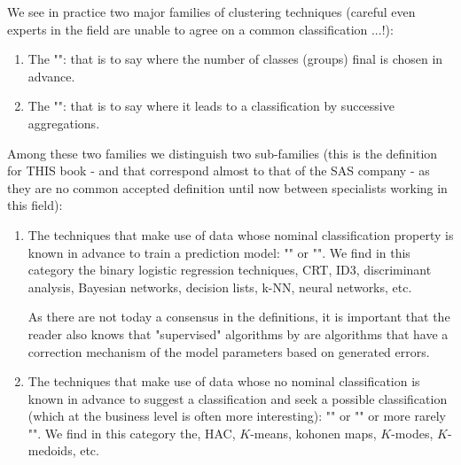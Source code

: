 	We see in practice two major families of clustering techniques (careful even experts in the field are unable to agree on a common classification ...!):
	\begin{enumerate}
		\item The "": that is to say where the number of classes (groups) final is chosen in advance.

		\item The "": that is to say where it leads to a classification by successive aggregations.
	\end{enumerate}
	Among these two families we distinguish two sub-families (this is the definition for THIS book - and that correspond almost to that of the SAS company - as they are no common accepted definition until now between specialists working in this field):
	\begin{enumerate}
		\item The techniques that make use of data whose nominal classification property is known in advance to train a prediction model: "" or "". We find in this category the binary logistic regression techniques, CRT, ID3, discriminant analysis, Bayesian networks, decision lists, k-NN, neural networks, etc. 

		As there are not today a consensus in the definitions, it is important that the reader also knows that "supervised" algorithms by are algorithms that have a correction mechanism of the model parameters based on generated errors.
	
		\item The techniques that make use of data whose no nominal classification is known in advance to suggest a classification and seek a possible classification (which at the business level is often more interesting): "" or "" or more rarely "". We find in this category the, HAC, $K$-means, kohonen maps, $K$-modes, $K$-medoids, etc.
	\end{enumerate}
